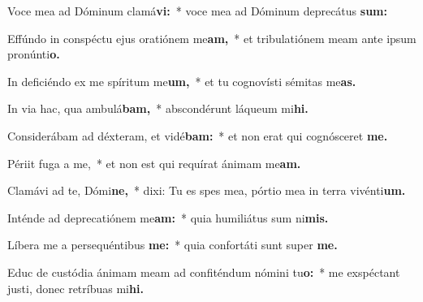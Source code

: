 \item Voce mea ad Dóminum clamá\textbf{vi:}~* voce mea ad Dóminum deprecátus \textbf{sum:}
\item Effúndo in conspé\-ctu ejus oratiónem me\textbf{am,}~* et tribulatiónem meam ante i\-psum pronúnti\textbf{o.}
\item In deficiéndo ex me spíritum me\textbf{um,}~* et tu cognovísti sémitas me\textbf{as.}
\item In via hac, qua ambulá\textbf{bam,}~* abscondérunt láqueum mi\textbf{hi.}
\item Considerábam ad déxteram, et vidé\textbf{bam:}~* et non erat qui cognósceret \textbf{me.}
\item Périit fuga a me,~* et non est qui requírat ánimam me\textbf{am.}
\item Clamávi ad te, Dómi\textbf{ne,}~* dixi: Tu es spes mea, pórtio mea in terra vivénti\textbf{um.}
\item Inténde ad deprecatiónem me\textbf{am:}~* quia humiliátus sum ni\textbf{mis.}
\item Líbera me a persequéntibus \textbf{me:}~* quia confortáti sunt super \textbf{me.}
\item Educ de custódia ánimam meam ad confiténdum nómini tu\textbf{o:}~* me exspé\-ctant justi, donec retríbuas mi\textbf{hi.}